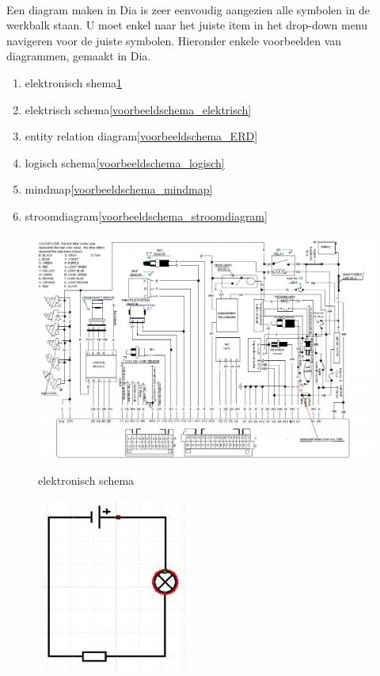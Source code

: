 \documentclass[12pt,a4paper]{report}
\begin{document}
\begin{flushleft}
\paragraph*{}
Een diagram maken in Dia is zeer eenvoudig aangezien alle symbolen in de werkbalk staan. U moet enkel naar het juiste item in het drop-down menu navigeren voor de juiste symbolen. Hieronder enkele voorbeelden van diagrammen, gemaakt in Dia.
\begin{enumerate}
\item	elektronisch shema\ref{voorbeeldschema_elektronisch}
\item	elektrisch schema\ref{voorbeeldschema_elektrisch}
\item	entity relation diagram\ref{voorbeeldschema_ERD}
\item	logisch schema\ref{voorbeeldschema_logisch}
\item	mindmap\ref{voorbeeldschema_mindmap}
\item	stroomdiagram\ref{voorbeeldschema_stroomdiagram}
\end{enumerate}
\begin{figure}[H]
\includegraphics[scale=0.5]{images/voorbeeldschema_elektronisch.png}
\label{voorbeeldschema_elektronisch}
\centering 
\vspace{-10pt}
\caption{elektronisch schema}
\end{figure}
\begin{figure}[H]
\includegraphics[scale=1]{images/voorbeeldschema_elektrisch.png}

\end{figure}
\end{flushleft}
\end{document}
